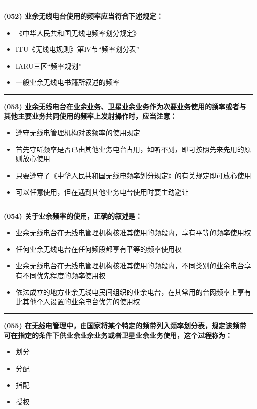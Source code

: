 \documentclass[twocolumn]{ctexart}  %
\begin{document}
\noindent\rule{0.5\textwidth}{1pt}
\heiti \textbf{(052) 业余无线电台使用的频率应当符合下述规定：} \songti {\color{gray} [LK0047] }
\begin{itemize}
	\item  《中华人民共和国无线电频率划分规定》
	\item  ITU《无线电规则》第IV节“频率划分表”
	\item  IARU三区“频率规划”
	\item  一般业余无线电书籍所叙述的频率
\end{itemize}


\noindent\rule{0.5\textwidth}{1pt}
\heiti \textbf{(053) 业余无线电台在业余业务、卫星业余业务作为次要业务使用的频率或者与其他主要业务共同使用的频率上发射操作时，应当注意：} \songti {\color{gray} [LK0048] }
\begin{itemize}
	\item  遵守无线电管理机构对该频率的使用规定
	\item  首先守听频率是否已由其他业务电台占用，如听不到，即可按照先来先用的原则放心使用
	\item  只要遵守了《中华人民共和国无线电频率划分规定》的有关规定即可放心使用
	\item  可以任意使用，但在遇到其他业务电台使用时要主动避让
\end{itemize}


\noindent\rule{0.5\textwidth}{1pt}
\heiti \textbf{(054) 关于业余频率的使用，正确的叙述是：} \songti {\color{gray} [LK0049] }
\begin{itemize}
	\item  业余无线电台在无线电管理机构核准其使用的频段内，享有平等的频率使用权
	\item  任何业余无线电台在任何频段都享有平等的频率使用权
	\item  业余无线电台在无线电管理机构核准其使用的频段内，不同类别的业余电台享有不同优先程度的频率使用权
	\item  依法成立的地方业余无线电民间组织的业余电台，在其常用的台网频率上享有比其他个人设置的业余电台优先的使用权
\end{itemize}


\noindent\rule{0.5\textwidth}{1pt}
\heiti \textbf{(055) 在无线电管理中，由国家将某个特定的频带列入频率划分表，规定该频带可在指定的条件下供业余业余业务或者卫星业余业务使用，这个过程称为：} \songti {\color{gray} [LK0113] }
\begin{itemize}
	\item  划分
	\item  分配
	\item  指配
	\item  授权
\end{itemize}
\end{document}
